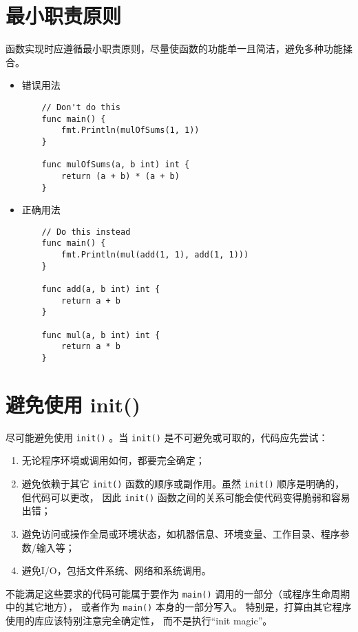 \section{最小职责原则}
函数实现时应遵循最小职责原则，尽量使函数的功能单一且简洁，避免多种功能揉合。
\begin{itemize}[leftmargin=4em]
\item 错误用法

  \begin{verbatim}
    // Don't do this
    func main() {
    	fmt.Println(mulOfSums(1, 1))
    }

    func mulOfSums(a, b int) int {
    	return (a + b) * (a + b)
    }
  \end{verbatim}
\item 正确用法

  \begin{verbatim}
    // Do this instead
    func main() {
    	fmt.Println(mul(add(1, 1), add(1, 1)))
    }

    func add(a, b int) int {
    	return a + b
    }

    func mul(a, b int) int {
    	return a * b
    }
  \end{verbatim}
\end{itemize}

\section{避免使用 init()}
尽可能避免使用 \texttt{init()} 。当 \texttt{init()} 是不可避免或可取的，代码应先尝试：
\begin{enumerate}[leftmargin=4em]
\item 无论程序环境或调用如何，都要完全确定；
\item 避免依赖于其它 \texttt{init()} 函数的顺序或副作用。虽然 \texttt{init()} 顺序是明确的，但代码可以更改， 因此 \texttt{init()} 函数之间的关系可能会使代码变得脆弱和容易出错；
\item 避免访问或操作全局或环境状态，如机器信息、环境变量、工作目录、程序参数/输入等；
\item 避免I/O，包括文件系统、网络和系统调用。
\end{enumerate}

不能满足这些要求的代码可能属于要作为 \texttt{main()} 调用的一部分（或程序生命周期中的其它地方）， 或者作为 \texttt{main()} 本身的一部分写入。
特别是，打算由其它程序使用的库应该特别注意完全确定性， 而不是执行“init magic”。

